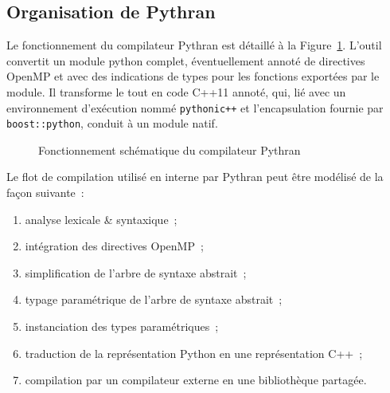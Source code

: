 \documentclass[renpar]{compas2013}
\begin{document}
\subsection{Organisation de Pythran}

Le fonctionnement du compilateur Pythran est détaillé à la
Figure~\ref{fig:pythran}. L'outil convertit un module python complet,
éventuellement annoté de directives OpenMP et avec des indications de
types pour les fonctions exportées par le module. Il transforme le tout en
code C++11 annoté, qui, lié avec un environnement d'exécution nommé
\texttt{pythonic++} et l'encapsulation fournie par \texttt{boost::python},
conduit à un module natif.

\begin{figure}
  \centering

  \caption{Fonctionnement schématique du compilateur Pythran}
  \label{fig:pythran}
\end{figure}

Le flot de compilation utilisé en interne par Pythran peut être modélisé de la façon
suivante~:

\begin{enumerate}
  \item\label{enum:lex-yacc} analyse lexicale \& syntaxique~;
  \item\label{enum:openmp} intégration des directives OpenMP~;
  \item\label{enum:simplification-ast} simplification de l'arbre de syntaxe abstrait~;
  \item\label{enum:typage-ast} typage paramétrique de l'arbre de syntaxe abstrait~;
  \item\label{enum:instanciation-types} instanciation des types paramétriques~;
  \item\label{enum:traduction-cxx} traduction de la représentation Python en une représentation C++~;
  \item\label{enum:compilation-extrene} compilation par un compilateur externe en une bibliothèque
	partagée.
\end{enumerate}
\end{document}
